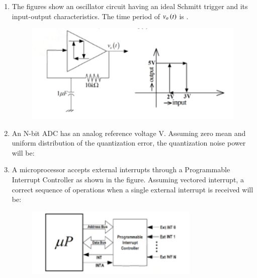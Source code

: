 \documentclass[journal,12pt,onecolumn]{IEEEtran}
\theoremstyle{remark}
\begin{document}
\begin{enumerate}
    \item The figures show an oscillator circuit having an ideal Schmitt trigger and its input-output characteristics. The time period  of $v_o\left(t\right)$ is \underline{\hspace{2cm}}.
    \begin{figure}[H]
        \centering
        \includegraphics[width=0.55\columnwidth]{q40}
        \caption*{}
        \label{fig:q40}
    \end{figure}

    \hfill{}
    
    \item An N-bit ADC has an analog reference voltage V. Assuming zero mean and uniform distribution of the quantization error, the quantization noise power will be:

    \hfill{}
        \begin{enumerate}
        \end{enumerate}
    
    \item A microprocessor accepts external interrupts  through a Programmable Interrupt Controller as shown in the figure. Assuming vectored interrupt, a correct sequence of operations when a single external interrupt  is received will be:
    \begin{figure}[H]
        \centering
        \includegraphics[width=0.6\columnwidth]{q42}
        \caption*{}
        \label{fig:q42}
    \end{figure}


\end{enumerate}
\end{document}
